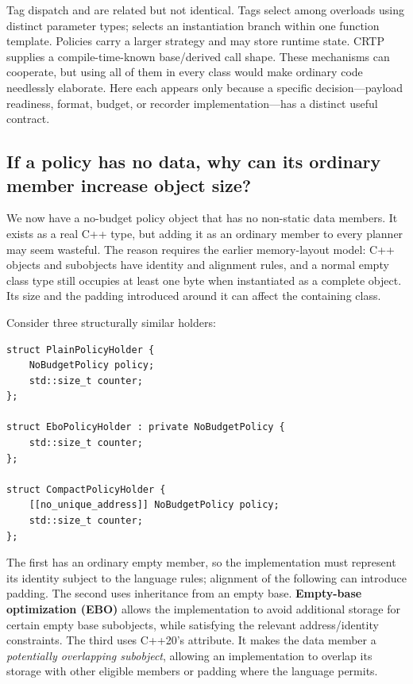 Tag dispatch and  are related but not identical. Tags select among overloads using distinct parameter types;  selects an instantiation branch within one function template. Policies carry a larger strategy and may store runtime state. CRTP supplies a compile-time-known base/derived call shape. These mechanisms can cooperate, but using all of them in every class would make ordinary code needlessly elaborate. Here each appears only because a specific decision---payload readiness, format, budget, or recorder implementation---has a distinct useful contract.

\subsection{If a policy has no data, why can its ordinary member increase object size?}\label{01-foundations-i-ch005-if-a-policy-has-no-data-why-can-its-ordinary-member-increase-object-size}

\hypertarget{01-foundations-i-ch005-if-a-policy-has-no-data-why-can-its-ordinary-member-increase-object-size}{}

We now have a no-budget policy object that has no non-static data members. It exists as a real C++ type, but adding it as an ordinary member to every planner may seem wasteful. The reason requires the earlier memory-layout model: C++ objects and subobjects have identity and alignment rules, and a normal empty class type still occupies at least one byte when instantiated as a complete object. Its size and the padding introduced around it can affect the containing class.

Consider three structurally similar holders:

\begin{verbatim}
struct PlainPolicyHolder {
    NoBudgetPolicy policy;
    std::size_t counter;
};

struct EboPolicyHolder : private NoBudgetPolicy {
    std::size_t counter;
};

struct CompactPolicyHolder {
    [[no_unique_address]] NoBudgetPolicy policy;
    std::size_t counter;
};
\end{verbatim}

The first has an ordinary empty member, so the implementation must represent its identity subject to the language rules; alignment of the following  can introduce padding. The second uses inheritance from an empty base. \textbf{Empty-base optimization (EBO)} allows the implementation to avoid additional storage for certain empty base subobjects, while satisfying the relevant address/identity constraints. The third uses C++20's  attribute. It makes the data member a \emph{potentially overlapping subobject}, allowing an implementation to overlap its storage with other eligible members or padding where the language permits.

